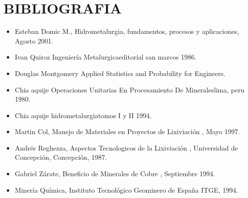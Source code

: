 \chapter{BIBLIOGRAFIA}
\begin{itemize}
 \item Esteban Domic	M., \textacutedbl Hidrometalurgia, fundamentos, procesos y aplicaciones\textgravedbl, Agosto 2001.

 \item Ivan Quiroz \textacutedbl Ingenier\'ia Metalurgica\textgravedbl editorial san marcos 1986.

 \item Douglas Montgomery \textacutedbl Applied Statistics and Probability for Engineers. 

 \item Chia aquije \textacutedbl Operaciones Unitarias En Procesamiento De Minerales\textgravedbl lima, peru 1980.

 \item Chia aquije \textacutedbl hidrometalurgia\textgravedbl tomos I y II 1994.

 \item Martin Col, \textacutedbl Manejo de Materiales en Proyectos de Lixiviaci\'on \textgravedbl, Mayo 1997.

 \item Andr\'es Reghezza, \textacutedbl Aspectos Tecnologicos de la Lixiviaci\'on \textgravedbl, Universidad de Concepci\'on, Concepci\'on, 1987.

 \item Gabriel Z\'arate, \textacutedbl Beneficio de Minerales de Cobre \textgravedbl, Septiembre 1994.

 \item \textacutedbl Miner\'ia Química\textgravedbl, Instituto Tecnol\'ogico Geominero de Espa\~na ITGE, 1994.
\end{itemize}

	